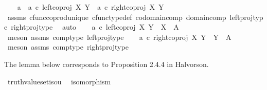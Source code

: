 \begin{isabellebody}
\ \ \isamarkupfalse%
\ {\isachardoublequoteopen}a\ {\isacharequal}{\kern0pt}\ {\isacharparenleft}{\kern0pt}a\ {\isasymcirc}\isactrlsub c\ left{\isacharunderscore}{\kern0pt}coproj\ X\ Y{\isacharparenright}{\kern0pt}\ {\isasymamalg}\ {\isacharparenleft}{\kern0pt}a\ {\isasymcirc}\isactrlsub c\ right{\isacharunderscore}{\kern0pt}coproj\ X\ Y{\isacharparenright}{\kern0pt}{\isachardoublequoteclose}\isanewline
\ \ \ \ \isamarkupfalse%
\ assms\ cfunc{\isacharunderscore}{\kern0pt}coprod{\isacharunderscore}{\kern0pt}unique\ cfunc{\isacharunderscore}{\kern0pt}type{\isacharunderscore}{\kern0pt}def\ codomain{\isacharunderscore}{\kern0pt}comp\ domain{\isacharunderscore}{\kern0pt}comp\ left{\isacharunderscore}{\kern0pt}proj{\isacharunderscore}{\kern0pt}type\ right{\isacharunderscore}{\kern0pt}proj{\isacharunderscore}{\kern0pt}type\ \isamarkupfalse%
\ auto\isanewline
\ \ \isamarkupfalse%
\ {\isachardoublequoteopen}a\ {\isasymcirc}\isactrlsub c\ left{\isacharunderscore}{\kern0pt}coproj\ X\ Y\ {\isacharcolon}{\kern0pt}\ X\ {\isasymrightarrow}\ A{\isachardoublequoteclose}\isanewline
\ \ \ \ \isamarkupfalse%
\ {\isacharparenleft}{\kern0pt}meson\ assms\ comp{\isacharunderscore}{\kern0pt}type\ left{\isacharunderscore}{\kern0pt}proj{\isacharunderscore}{\kern0pt}type{\isacharparenright}{\kern0pt}\isanewline
\ \ \isamarkupfalse%
\ {\isachardoublequoteopen}a\ {\isasymcirc}\isactrlsub c\ right{\isacharunderscore}{\kern0pt}coproj\ X\ Y\ {\isacharcolon}{\kern0pt}\ Y\ {\isasymrightarrow}\ A{\isachardoublequoteclose}\isanewline
\ \ \ \ \isamarkupfalse%
\ {\isacharparenleft}{\kern0pt}meson\ assms\ comp{\isacharunderscore}{\kern0pt}type\ right{\isacharunderscore}{\kern0pt}proj{\isacharunderscore}{\kern0pt}type{\isacharparenright}{\kern0pt}\isanewline
{}\isamarkupfalse%
%
\endisatagproof
{\isafoldproof}%
%
\isadelimproof
%
\endisadelimproof
%
\begin{isamarkuptext}%
The lemma below corresponds to Proposition 2.4.4 in Halvorson.%
\end{isamarkuptext}\isamarkuptrue%
\isamarkupfalse%
\ truth{\isacharunderscore}{\kern0pt}value{\isacharunderscore}{\kern0pt}set{\isacharunderscore}{\kern0pt}iso{\isacharunderscore}{\kern0pt}{}u{}{\isacharcolon}{\kern0pt}\isanewline
\ \ {\isachardoublequoteopen}isomorphism{\isacharparenleft}{\kern0pt}{\isasymt}{\isasymamalg}{\isasymf}{\isacharparenright}{\kern0pt}{\isachardoublequoteclose}\isanewline
%
\isadelimproof
\ \ %

\end{isabellebody}
